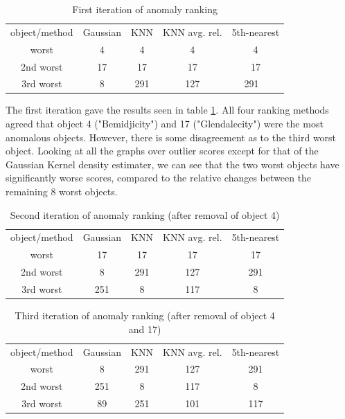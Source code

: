 \documentclass[a4paper]{article}
\begin{document}
\begin{table}[H]
\begin{tabular}{c | c c c c}
  object/method & Gaussian & KNN & KNN avg. rel. & 5th-nearest \\
  worst & 4 & 4 & 4 & 4 \\
  2nd worst & 17 & 17 & 17 & 17 \\
  3rd worst & 8 & 291 & 127 & 291 \
\end{tabular}
\caption{First iteration of anomaly ranking}
\label{table_ite1}
\end{table}

The first iteration gave the results seen in table \ref{table_ite1}. All four ranking methods agreed that object 4 ("Bemidjicity") and 17 ("Glendalecity") were the most anomalous objects. However, there is some disagreement as to the third worst object. Looking at all the graphs over outlier scores except for that of the Gaussian Kernel density estimater, we can see that the two worst objects have significantly worse scores, compared to the relative changes between the remaining 8 worst objects.

\begin{table}[H]
\begin{tabular}{c | c c c c}
  object/method
        & Gaussian
                & KNN
                        & KNN avg. rel.
                          & 5th-nearest \\
  worst     & 17  & 17  & 17  & 17   \\
  2nd worst & 8   & 291 & 127 & 291  \\
  3rd worst & 251 & 8   & 117 & 8
\end{tabular}
\caption{Second iteration of anomaly ranking (after removal of object 4)}
\label{table_ite2}
\end{table}

\begin{table}[H]
\begin{tabular}{c | c c c c}
  object/method
        & Gaussian
                & KNN
                        & KNN avg. rel.
                          & 5th-nearest \\
  worst     & 8   & 291 & 127 & 291 \\
  2nd worst & 251 & 8   & 117 & 8   \\
  3rd worst & 89  & 251 & 101 & 117 
\end{tabular}
\caption{Third iteration of anomaly ranking (after removal of object 4 and 17)}
\label{table_ite3}
\end{table}
\end{document}
